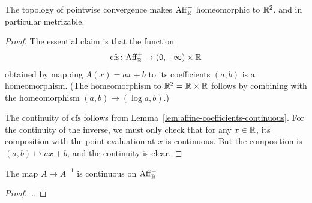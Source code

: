 \begin{lemma}
  \label{lem:affine-metrizable}
  \leanok
  The topology of pointwise convergence makes $\mathrm{Aff}^+_{\mathbb{R}}$
  homeomorphic to $\mathbb{R}^2$, and in particular
  metrizable.
\end{lemma}
\begin{proof}
  The essential claim is that the function
  \begin{align*}
    \mathrm{cfs} \colon \mathrm{Aff}^+_{\mathbb{R}} \to (0,+\infty) \times \mathbb{R}
  \end{align*}
  obtained by mapping $A(x) = a x + b$ to its coefficients $(a,b)$ is a homeomorphism.
  (The homeomorphism to $\mathbb{R}^2 = \mathbb{R} \times \mathbb{R}$ follows by combining with the
  homeomorphism $(a,b) \mapsto (\log a, b)$.)

  The continuity of $\mathrm{cfs}$ follows from Lemma~\ref{lem:affine-coefficients-continuous}.
  For the continuity of the inverse, we must only check that for any $x \in \mathbb{R}$,
  its composition with the point evaluation at $x$ is continuous. But the composition
  is $(a,b) \mapsto a x + b$, and the continuity is clear.
\end{proof}

\begin{lemma}
  \label{lem:affine-inversion-continuous}
  \leanok
  The map $A \mapsto A^{-1}$ is continuous on $\mathrm{Aff}^+_{\mathbb{R}}$
\end{lemma}
\begin{proof}
  \ldots
\end{proof}

